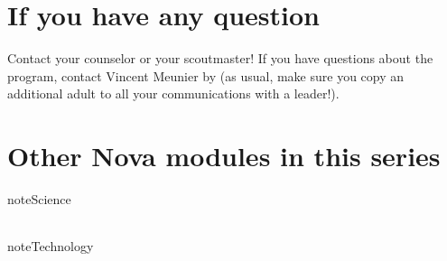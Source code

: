 \documentclass[letterpaper,10pt,english,openany,oneside]{sphinxmanual}
\begin{document}
\section{If you have any question}
\label{\detokenize{introduction:if-you-have-any-question}}
Contact your counselor or your scoutmaster! If you have questions about the program, contact Vincent Meunier  by  (as usual, make sure you copy an additional adult to all your communications with a leader!).


\section{Other Nova modules in this series}
\label{\detokenize{introduction:other-nova-modules-in-this-series}}
\begin{sphinxadmonition}{note}{Science}


\begin{savenotes}\sphinxattablestart
\centering
\begin{tabulary}{\linewidth}[t]{|T|}
\hline




\\
\hline
\end{tabulary}
\par
\sphinxattableend\end{savenotes}
\end{sphinxadmonition}

\begin{sphinxadmonition}{note}{Technology}


\begin{savenotes}\sphinxattablestart
\centering
\begin{tabulary}{\linewidth}[t]{|T|}
\hline


\\
\hline
\end{tabulary}
\par
\sphinxattableend\end{savenotes}
\end{sphinxadmonition}
\end{document}
